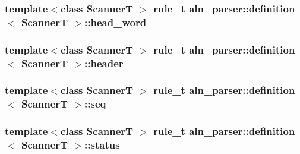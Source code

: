 \hypertarget{structaln__parser_1_1definition_a4ae49d8047c2156cbf75510ef5f3b434}{
\subsubsection[{head\+\_\+word}]{\setlength{\rightskip}{0pt plus 5cm}template$<$class Scanner\+T $>$ {\bf rule\+\_\+t} {\bf aln\+\_\+parser\+::definition}$<$ Scanner\+T $>$\+::head\+\_\+word}}\label{structaln__parser_1_1definition_a4ae49d8047c2156cbf75510ef5f3b434}
\hypertarget{structaln__parser_1_1definition_a7c56859f82c03b3f85d16095aea09f65}{
\subsubsection[{header}]{\setlength{\rightskip}{0pt plus 5cm}template$<$class Scanner\+T $>$ {\bf rule\+\_\+t} {\bf aln\+\_\+parser\+::definition}$<$ Scanner\+T $>$\+::header}}\label{structaln__parser_1_1definition_a7c56859f82c03b3f85d16095aea09f65}
\hypertarget{structaln__parser_1_1definition_a9f351b4a43adddc5d115367c48c9ec6c}{
\subsubsection[{seq}]{\setlength{\rightskip}{0pt plus 5cm}template$<$class Scanner\+T $>$ {\bf rule\+\_\+t} {\bf aln\+\_\+parser\+::definition}$<$ Scanner\+T $>$\+::seq}}\label{structaln__parser_1_1definition_a9f351b4a43adddc5d115367c48c9ec6c}
\hypertarget{structaln__parser_1_1definition_a4209d9d63ba0c23bda9e14357d05c77a}{
\subsubsection[{status}]{\setlength{\rightskip}{0pt plus 5cm}template$<$class Scanner\+T $>$ {\bf rule\+\_\+t} {\bf aln\+\_\+parser\+::definition}$<$ Scanner\+T $>$\+::status}}\label{structaln__parser_1_1definition_a4209d9d63ba0c23bda9e14357d05c77a}
